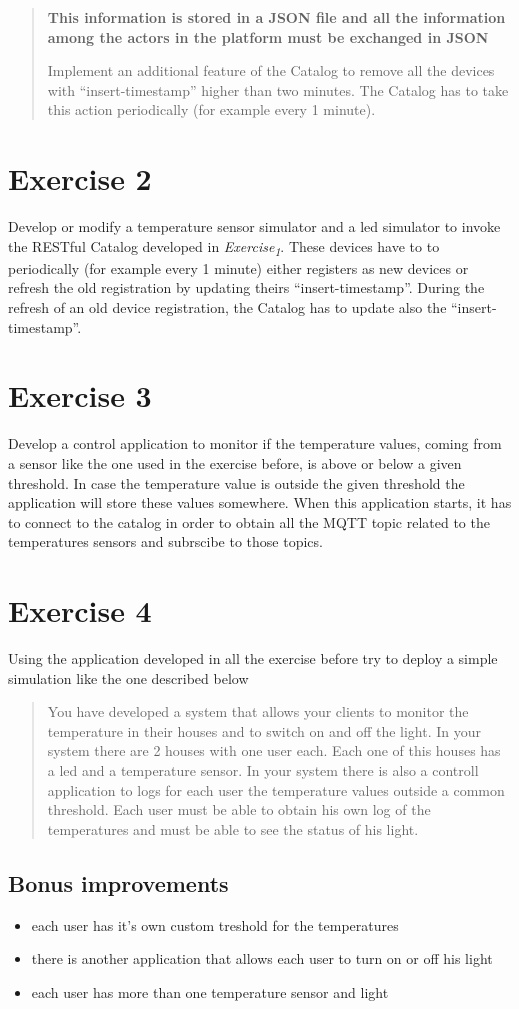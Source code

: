 \documentclass{article}
\begin{document}
\begin{quote}
\textbf{This information is stored in a JSON file and all the information
among the actors in the platform must be exchanged in JSON}

Implement an additional feature of the Catalog to remove all the
devices with “insert-timestamp” higher than two minutes. The Catalog
has to take this action periodically (for example every 1 minute).
\end{quote}

\section{Exercise 2}
\label{sec:org3da5a37}
Develop or modify a temperature sensor simulator and a led simulator to invoke the RESTful Catalog developed in \emph{Exercise\textsubscript{1}}. These devices have to  to periodically (for example every 1 minute) either registers as new devices or refresh the old registration by updating theirs “insert-timestamp”. During the refresh of an old device registration, the Catalog has to update also the “insert-timestamp”.

\section{Exercise 3}
\label{sec:org1c44cec}
Develop a control application to monitor if the temperature values, coming from a sensor like the one used in the exercise before, is above or below a given threshold. In case the temperature value is outside the given threshold the application will store these values somewhere. When this application starts, it has to connect to the catalog in order to obtain all the MQTT topic related to the temperatures sensors and subrscibe to those topics.

\section{Exercise 4}
\label{sec:org54c4adf}

Using the application developed in all the exercise before try to deploy a simple simulation like the one described below

\begin{quote}
You have developed a system that allows your clients to monitor the temperature in their houses and to switch on and off the light. In your system there are 2 houses with one user each. Each one of this houses has a led and a temperature sensor. In your system there is also a controll application to logs for each user the temperature values outside a common threshold. Each user must be able to obtain his own log of the temperatures and must be able to see the status of his light.
\end{quote}

\subsection{Bonus improvements}
\label{sec:org72b3caf}
\begin{itemize}
\item each user has it's own custom treshold for the temperatures
\item there is another application that allows each user to turn on or off his light
\item each user has more than one temperature sensor and light
\end{itemize}
\end{document}
